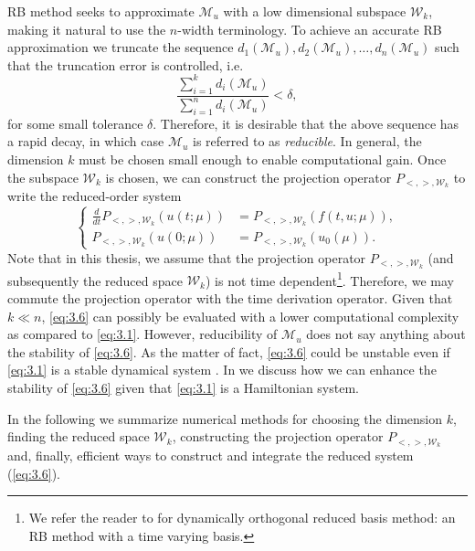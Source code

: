 RB method seeks to approximate $\mathcal M_u$ with a low dimensional subspace $\mathcal W_k$, making it natural to use the $n$-width terminology. To achieve an accurate RB approximation we truncate the sequence $d_1(\mathcal M_u),d_2(\mathcal M_u),\dots, d_n(\mathcal M_u)$ such that the truncation error is controlled, i.e.
\begin{equation} \label{eq:3.5}
	\frac{\sum_{i=1}^k d_i(\mathcal M_u) }{\sum_{i=1}^n d_i(\mathcal M_u) } < \delta,
\end{equation}
for some small tolerance $\delta$. Therefore, it is desirable that the above sequence has a rapid decay, in which case $\mathcal M_u$ is referred to as \emph{reducible}. In general, the dimension $k$ must be chosen small enough to enable computational gain. Once the subspace $\mathcal W_k$ is chosen, we can construct the projection operator $P_{<,>,\mathcal W_k}$ to write the reduced-order system
\begin{equation} \label{eq:3.6}
\left\{
\begin{aligned}
	\frac d{dt} P_{<,>,\mathcal W_k}(u(t;\mu)) &= P_{<,>,\mathcal W_k}(f(t,u;\mu)),\\
	P_{<,>,\mathcal W_k}(u(0;\mu)) &= P_{<,>,\mathcal W_k}( u_0(\mu) ).
\end{aligned}
\right.
\end{equation}
Note that in this thesis, we assume that the projection operator $P_{<,>,\mathcal W_k}$ (and subsequently the reduced space $\mathcal W_k$) is not time dependent\footnote{We refer the reader to \cite{doi:10.1137/140967787,doi:10.1137/16M1095202} for dynamically orthogonal reduced basis method: an RB method with a time varying basis.}. Therefore, we may commute the projection operator with the time derivation operator. Given that $k \ll n$, \eqref{eq:3.6} can possibly be evaluated with a lower computational complexity as compared to \eqref{eq:3.1}. However, reducibility of $\mathcal M_u$ does not say anything about the stability of \eqref{eq:3.6}. As the matter of fact, \eqref{eq:3.6} could be unstable even if \eqref{eq:3.1} is a stable dynamical system \cite{doi:10.1137/140978922,doi:10.1137/17M1111991}. In  we discuss how we can enhance the stability of \eqref{eq:3.6} given that \eqref{eq:3.1} is a Hamiltonian system.

In the following we summarize numerical methods for choosing the dimension $k$, finding the reduced space $\mathcal W_k$, constructing the projection operator $P_{<,>,\mathcal W_k}$ and, finally, efficient ways to construct and integrate the reduced system (\ref{eq:3.6}).

